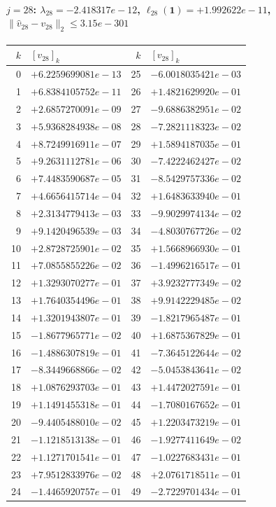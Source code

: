 \paragraph{$j = 28$: $\lambda_{28} = -2.418317e-12$, \quad $\ell_{28}(\mathbf{1}) = +1.992622e-11$, \quad $\|\hat{v}_{28} - v_{28}\|_2 \leq 3.15e-301$}
\begin{center}
{\footnotesize
\begin{tabular}{r@{\;\;}l@{\quad}r@{\;\;}l}
\toprule
$k$ & $[v_{28}]_k$ & $k$ & $[v_{28}]_k$ \\
\midrule
0 & $+6.2259699081e-13$ & 25 & $-6.0018035421e-03$ \\
1 & $+6.8384105752e-11$ & 26 & $+1.4821629920e-01$ \\
2 & $+2.6857270091e-09$ & 27 & $-9.6886382951e-02$ \\
3 & $+5.9368284938e-08$ & 28 & $-7.2821118323e-02$ \\
4 & $+8.7249916911e-07$ & 29 & $+1.5894187035e-01$ \\
5 & $+9.2631112781e-06$ & 30 & $-7.4222462427e-02$ \\
6 & $+7.4483590687e-05$ & 31 & $-8.5429757336e-02$ \\
7 & $+4.6656415714e-04$ & 32 & $+1.6483633940e-01$ \\
8 & $+2.3134779413e-03$ & 33 & $-9.9029974134e-02$ \\
9 & $+9.1420496539e-03$ & 34 & $-4.8030767726e-02$ \\
10 & $+2.8728725901e-02$ & 35 & $+1.5668966930e-01$ \\
11 & $+7.0855855226e-02$ & 36 & $-1.4996216517e-01$ \\
12 & $+1.3293070277e-01$ & 37 & $+3.9232777349e-02$ \\
13 & $+1.7640354496e-01$ & 38 & $+9.9142229485e-02$ \\
14 & $+1.3201943807e-01$ & 39 & $-1.8217965487e-01$ \\
15 & $-1.8677965771e-02$ & 40 & $+1.6875367829e-01$ \\
16 & $-1.4886307819e-01$ & 41 & $-7.3645122644e-02$ \\
17 & $-8.3449668866e-02$ & 42 & $-5.0453843641e-02$ \\
18 & $+1.0876293703e-01$ & 43 & $+1.4472027591e-01$ \\
19 & $+1.1491455318e-01$ & 44 & $-1.7080167652e-01$ \\
20 & $-9.4405488010e-02$ & 45 & $+1.2203473219e-01$ \\
21 & $-1.1218513138e-01$ & 46 & $-1.9277411649e-02$ \\
22 & $+1.1271701541e-01$ & 47 & $-1.0227683431e-01$ \\
23 & $+7.9512833976e-02$ & 48 & $+2.0761718511e-01$ \\
24 & $-1.4465920757e-01$ & 49 & $-2.7229701434e-01$ \\
\bottomrule
\end{tabular}
}
\end{center}

